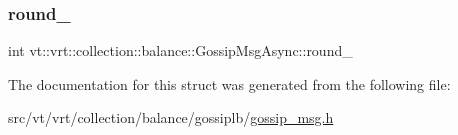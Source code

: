 \subsubsection{\texorpdfstring{round\+\_\+}{round\_}}
{\footnotesize\ttfamily int vt\+::vrt\+::collection\+::balance\+::\+Gossip\+Msg\+Async\+::round\+\_\+\hspace{0.3cm}{\ttfamily [private]}}



The documentation for this struct was generated from the following file\+:\begin{DoxyCompactItemize}
\item 
src/vt/vrt/collection/balance/gossiplb/\hyperlink{gossip__msg_8h}{gossip\+\_\+msg.\+h}\end{DoxyCompactItemize}
